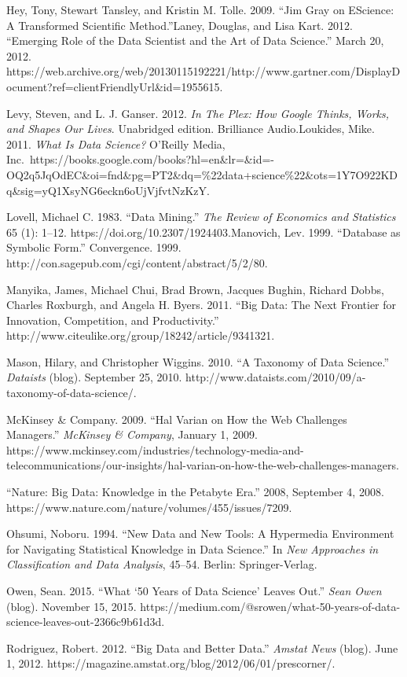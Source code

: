 \documentclass[
  letterpaper,
  DIV=11,
  numbers=noendperiod]{scrreprt}
\begin{document}
Hey, Tony, Stewart Tansley, and Kristin M. Tolle. 2009. ``Jim Gray on
EScience: A Transformed Scientific Method.''Laney, Douglas, and Lisa
Kart. 2012. ``Emerging Role of the Data Scientist and the Art of Data
Science.'' March 20, 2012.
https://web.archive.org/web/20130115192221/http://www.gartner.com/DisplayDocument?ref=clientFriendlyUrl\&id=1955615.

Levy, Steven, and L. J. Ganser. 2012. \emph{In The Plex: How Google
Thinks, Works, and Shapes Our Lives}. Unabridged edition. Brilliance
Audio.Loukides, Mike. 2011. \emph{What Is Data Science?} O'Reilly Media,
Inc.~https://books.google.com/books?hl=en\&lr=\&id=-OQ2q5JqOdEC\&oi=fnd\&pg=PT2\&dq=\%22data+science\%22\&ots=1Y7O922KDq\&sig=yQ1XsyNG6eckn6oUjVjfvtNzKzY.

Lovell, Michael C. 1983. ``Data Mining.'' \emph{The Review of Economics
and Statistics} 65 (1): 1--12. https://doi.org/10.2307/1924403.Manovich,
Lev. 1999. ``Database as Symbolic Form.'' Convergence. 1999.
http://con.sagepub.com/cgi/content/abstract/5/2/80.

Manyika, James, Michael Chui, Brad Brown, Jacques Bughin, Richard Dobbs,
Charles Roxburgh, and Angela H. Byers. 2011. ``Big Data: The Next
Frontier for Innovation, Competition, and Productivity.''
http://www.citeulike.org/group/18242/article/9341321.

Mason, Hilary, and Christopher Wiggins. 2010. ``A Taxonomy of Data
Science.'' \emph{Dataists} (blog). September 25, 2010.
http://www.dataists.com/2010/09/a-taxonomy-of-data-science/.

McKinsey \& Company. 2009. ``Hal Varian on How the Web Challenges
Managers.'' \emph{McKinsey \& Company}, January 1, 2009.
https://www.mckinsey.com/industries/technology-media-and-telecommunications/our-insights/hal-varian-on-how-the-web-challenges-managers.

``Nature: Big Data: Knowledge in the Petabyte Era.'' 2008, September 4,
2008. https://www.nature.com/nature/volumes/455/issues/7209.

Ohsumi, Noboru. 1994. ``New Data and New Tools: A Hypermedia Environment
for Navigating Statistical Knowledge in Data Science.'' In \emph{New
Approaches in Classification and Data Analysis}, 45--54. Berlin:
Springer-Verlag.

Owen, Sean. 2015. ``What `50 Years of Data Science' Leaves Out.''
\emph{Sean Owen} (blog). November 15, 2015.
https://medium.com/@srowen/what-50-years-of-data-science-leaves-out-2366c9b61d3d.

Rodriguez, Robert. 2012. ``Big Data and Better Data.'' \emph{Amstat
News} (blog). June 1, 2012.
https://magazine.amstat.org/blog/2012/06/01/prescorner/.
\end{document}
